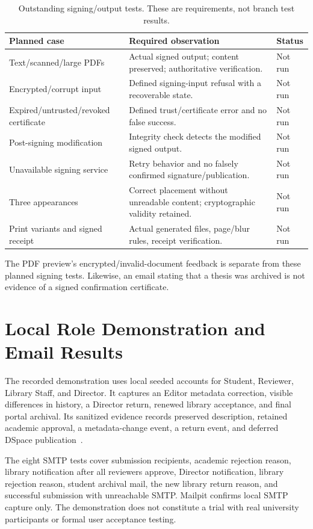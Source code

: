 \documentclass[11pt,a4paper]{report}
\begin{document}
\begin{table}[htbp]
\centering\small
\begin{tabularx}{\textwidth}{@{}Y Y l@{}}
\toprule
\textbf{Planned case} & \textbf{Required observation} & \textbf{Status} \\
\midrule
Text/scanned/large PDFs & Actual signed output; content preserved; authoritative verification. & Not run \\
Encrypted/corrupt input & Defined signing-input refusal with a recoverable state. & Not run \\
Expired/untrusted/revoked certificate & Defined trust/certificate error and no false success. & Not run \\
Post-signing modification & Integrity check detects the modified signed output. & Not run \\
Unavailable signing service & Retry behavior and no falsely confirmed signature/publication. & Not run \\
Three appearances & Correct placement without unreadable content; cryptographic validity retained. & Not run \\
Print variants and signed receipt & Actual generated files, page/blur rules, receipt verification. & Not run \\
\bottomrule
\end{tabularx}
\caption{Outstanding signing/output tests. These are requirements, not branch test results.}
\label{tab:planned-sign-tests}
\end{table}

The PDF preview's encrypted/invalid-document feedback is separate from these planned signing tests. Likewise, an email stating that a thesis was archived is not evidence of a signed confirmation certificate.

\section{Local Role Demonstration and Email Results}
The recorded demonstration uses local seeded accounts for Student, Reviewer, Library Staff, and Director. It captures an Editor metadata correction, visible differences in history, a Director return, renewed library acceptance, and final portal archival. Its sanitized evidence records preserved description, retained academic approval, a metadata-change event, a return event, and deferred DSpace publication~\cite{demo-evidence}.

The eight SMTP tests cover submission recipients, academic rejection reason, library notification after all reviewers approve, Director notification, library rejection reason, student archival mail, the new library return reason, and successful submission with unreachable SMTP. Mailpit confirms local SMTP capture only. The demonstration does not constitute a trial with real university participants or formal user acceptance testing.
\end{document}
